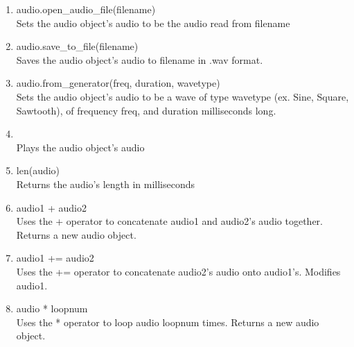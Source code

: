 \documentclass[11pt, letterpaper, onecolumn, oneside, final]{article}
\begin{document}
\begin{enumerate}
\begin{enumerate}
        \item {\consolas audio.open\_audio\_file(filename)} \\
        \hspace*{8mm}Sets the audio object's audio to be the audio read from {\consolas filename}
        
        \item {\consolas audio.save\_to\_file(filename)} \\
        \hspace*{8mm}Saves the audio object's audio to {\consolas filename} in .wav format.
        
        \item {\consolas audio.from\_generator(freq, duration, wavetype)} \\
        \hspace*{8mm}Sets the audio object's audio to be a wave of type {\consolas wavetype} (ex. Sine, Square, Sawtooth), of frequency {\consolas freq}, and {\consolas duration} milliseconds long.
        
        \item {} \\
        \hspace*{8mm}Plays the audio object's audio
        
        \item {\consolas len(audio)} \\
        \hspace*{8mm}Returns the audio's length in milliseconds
        
        \item {\consolas audio1 + audio2} \\
        \hspace*{8mm}Uses the + operator to concatenate {\consolas audio1} and {\consolas audio2}'s audio together. Returns a new audio object.
        
        \item {\consolas audio1 += audio2} \\
        \hspace*{8mm}Uses the += operator to concatenate {\consolas audio2}'s audio onto {\consolas audio1}'s.
        \hspace*{8mm}Modifies audio1.
        
        \item {\consolas audio * loopnum} \\
        \hspace*{8mm}Uses the * operator to loop {\consolas audio loopnum} times. Returns a new \hspace*{8mm}audio object.
        

\end{enumerate}
\end{enumerate}
\end{document}
